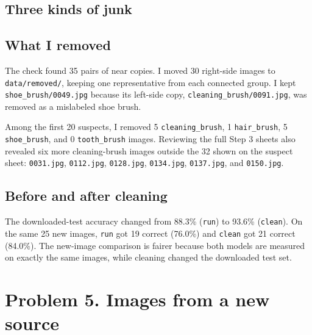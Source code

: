 \documentclass[11pt]{article}
\begin{document}
\subsection*{Three kinds of junk}


\subsection*{What I removed}

The check found 35 pairs of near copies. I moved 30 right-side images to
\texttt{data/removed/}, keeping one representative from each connected group.
I kept \texttt{shoe\_brush/0049.jpg} because its left-side copy,
\texttt{cleaning\_brush/0091.jpg}, was removed as a mislabeled shoe brush.

Among the first 20 suspects, I removed 5 \texttt{cleaning\_brush}, 1
\texttt{hair\_brush}, 5 \texttt{shoe\_brush}, and 0 \texttt{tooth\_brush}
images. Reviewing the full Step 3 sheets also revealed six more cleaning-brush
images outside the 32 shown on the suspect sheet:
\texttt{0031.jpg}, \texttt{0112.jpg}, \texttt{0128.jpg}, \texttt{0134.jpg},
\texttt{0137.jpg}, and \texttt{0150.jpg}.

\subsection*{Before and after cleaning}
\begin{center}\end{center}

The downloaded-test accuracy changed from 88.3\% (\texttt{run}) to 93.6\%
(\texttt{clean}). On the same 25 new images, \texttt{run} got 19 correct
(76.0\%) and \texttt{clean} got 21 correct (84.0\%). The new-image comparison
is fairer because both models are measured on exactly the same images, while
cleaning changed the downloaded test set.

\section*{Problem 5. Images from a new source}
\end{document}
